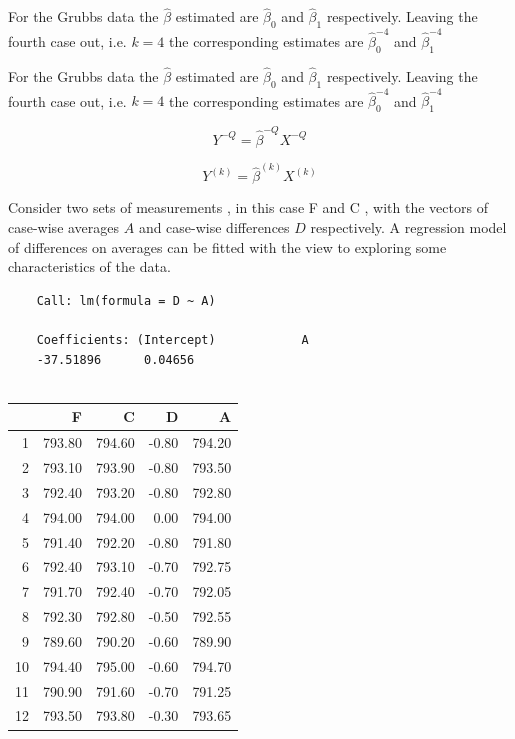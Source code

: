 \documentclass[12pt, a4paper]{report}
\theoremstyle{plain}
\theoremstyle{definition}
\theoremstyle{remark}
\begin{document}
	For the Grubbs data the $\hat{\beta}$ estimated are $\hat{\beta}_{0}$ and $\hat{\beta}_{1}$ respectively. Leaving the fourth case out, i.e. $k=4$ the corresponding estimates are $\hat{\beta}_{0}^{-4}$ and $\hat{\beta}_{1}^{-4}$
	
	For the Grubbs data the $\hat{\beta}$ estimated are
	$\hat{\beta}_{0}$ and $\hat{\beta}_{1}$ respectively. Leaving the
	fourth case out, i.e. $k=4$ the corresponding estimates are
	$\hat{\beta}_{0}^{-4}$ and $\hat{\beta}_{1}^{-4}$
	
	
	\begin{equation}
	Y^{-Q} = \hat{\beta}^{-Q}X^{-Q}
	\end{equation}
	
	\begin{equation}
	Y^{(k)} = \hat{\beta}^{(k)}X^{(k)}
	\end{equation}
	
	Consider two sets of measurements , in this case F and C , with the vectors of case-wise averages $A$ and case-wise differences $D$ respectively. A regression model of differences on averages can be fitted with the view to exploring some characteristics of the data.
	
	\begin{verbatim}
	Call: lm(formula = D ~ A)
	
	Coefficients: (Intercept)            A
	-37.51896      0.04656
	
	\end{verbatim}
	
	
	
	\begin{table}[ht]
		\begin{center}
			\begin{tabular}{rrrrr}
				\hline
				& F & C & D & A \\
				\hline
				1 & 793.80 & 794.60 & -0.80 & 794.20 \\
				2 & 793.10 & 793.90 & -0.80 & 793.50 \\
				3 & 792.40 & 793.20 & -0.80 & 792.80 \\
				4 & 794.00 & 794.00 & 0.00 & 794.00 \\
				5 & 791.40 & 792.20 & -0.80 & 791.80 \\
				6 & 792.40 & 793.10 & -0.70 & 792.75 \\
				7 & 791.70 & 792.40 & -0.70 & 792.05 \\
				8 & 792.30 & 792.80 & -0.50 & 792.55 \\
				9 & 789.60 & 790.20 & -0.60 & 789.90 \\
				10 & 794.40 & 795.00 & -0.60 & 794.70 \\
				11 & 790.90 & 791.60 & -0.70 & 791.25 \\
				12 & 793.50 & 793.80 & -0.30 & 793.65 \\
				\hline
			\end{tabular}
		\end{center}
	\end{table}
	
\end{document}
